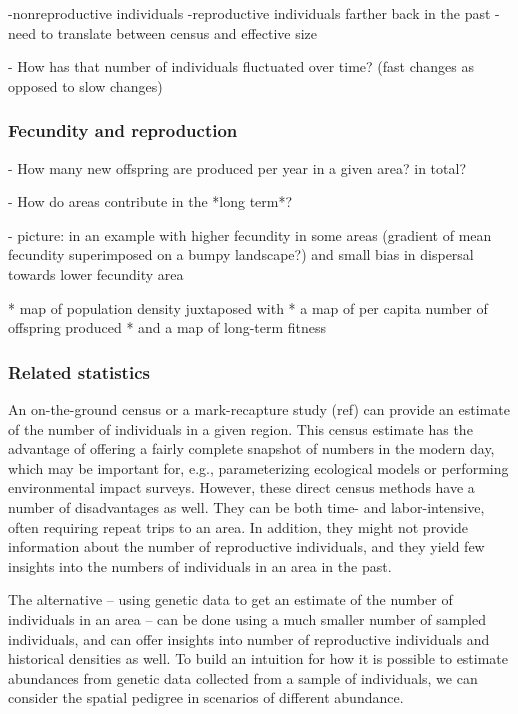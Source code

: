 \documentclass{ar-1col}
\begin{document}
	-nonreproductive individuals
		-reproductive individuals farther back in the past
	-need to translate between census and effective size


        - How has that number of individuals fluctuated over time? (fast changes as opposed to slow changes)

\subsubsection{Fecundity and reproduction}
        - How many new offspring are produced per year in a given area? in total?

        - How do areas contribute in the *long term*?

        - picture: 
            in an example with higher fecundity in some areas 
            (gradient of mean fecundity superimposed on a bumpy landscape?)
            and small bias in dispersal towards lower fecundity area

            * map of population density juxtaposed with
            * a map of per capita number of offspring produced
            * and a map of long-term fitness 
            
\subsubsection{Related statistics}
An on-the-ground census or a mark-recapture study (ref)
can provide an estimate of the number of individuals in a given region.
This census estimate has the advantage of offering a fairly complete 
snapshot of numbers in the modern day, 
which may be important for, e.g., 
parameterizing ecological models 
or performing environmental impact surveys.
However, these direct census methods have a number of disadvantages as well.
They can be both time- and labor-intensive, 
often requiring repeat trips to an area.
In addition, they might not provide information 
about the number of reproductive individuals, 
and they yield few insights into the numbers of individuals 
in an area in the past.

The alternative -- 
using genetic data to get an estimate of the number of individuals in an area -- 
can be done using a much smaller number of sampled individuals, 
and can offer insights into number of reproductive individuals and historical densities as well.
To build an intuition for how it is possible to estimate 
abundances from genetic data collected from a sample of individuals,
we can consider the spatial pedigree in scenarios of different abundance.
\end{document}
